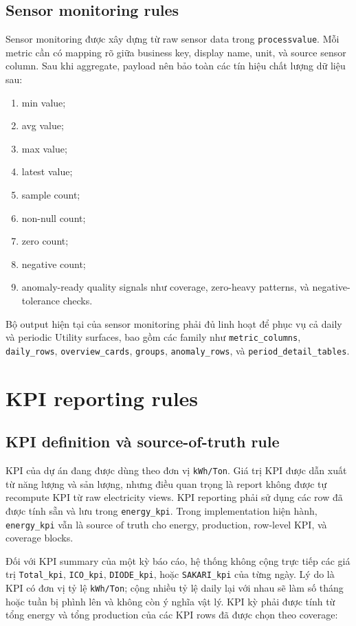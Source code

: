 \subsection{Sensor monitoring rules}

Sensor monitoring được xây dựng từ raw sensor data trong \texttt{processvalue}. Mỗi metric cần có mapping rõ giữa business key, display name, unit, và source sensor column. Sau khi aggregate, payload nên bảo toàn các tín hiệu chất lượng dữ liệu sau:

\begin{enumerate}[label=-]
\item min value;
\item avg value;
\item max value;
\item latest value;
\item sample count;
\item non-null count;
\item zero count;
\item negative count;
\item anomaly-ready quality signals như coverage, zero-heavy patterns, và negative-tolerance checks.
\end{enumerate}

Bộ output hiện tại của sensor monitoring phải đủ linh hoạt để phục vụ cả daily và periodic Utility surfaces, bao gồm các family như \texttt{metric\_columns}, \texttt{daily\_rows}, \texttt{overview\_cards}, \texttt{groups}, \texttt{anomaly\_rows}, và \texttt{period\_detail\_tables}.

\section{KPI reporting rules}

\subsection{KPI definition và source-of-truth rule}

KPI của dự án đang được dùng theo đơn vị \texttt{kWh/Ton}. Giá trị KPI được dẫn xuất từ năng lượng và sản lượng, nhưng điều quan trọng là report không được tự recompute KPI từ raw electricity views. KPI reporting phải sử dụng các row đã được tính sẵn và lưu trong \texttt{energy\_kpi}. Trong implementation hiện hành, \texttt{energy\_kpi} vẫn là source of truth cho energy, production, row-level KPI, và coverage blocks.

Đối với KPI summary của một kỳ báo cáo, hệ thống không cộng trực tiếp các giá trị \texttt{Total\_kpi}, \texttt{ICO\_kpi}, \texttt{DIODE\_kpi}, hoặc \texttt{SAKARI\_kpi} của từng ngày. Lý do là KPI có đơn vị tỷ lệ \texttt{kWh/Ton}; cộng nhiều tỷ lệ daily lại với nhau sẽ làm số tháng hoặc tuần bị phình lên và không còn ý nghĩa vật lý. KPI kỳ phải được tính từ tổng energy và tổng production của các KPI rows đã được chọn theo coverage:

